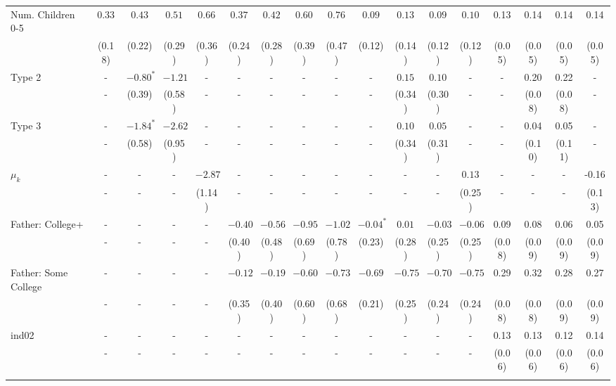 \begin{tabular}{lcccccccccccccccc}
Num. Children 0-5&$0.33$&$0.43$&$0.51$&$0.66$&$0.37$&$0.42$&$0.60$&$0.76$&$0.09$&$0.13$&$0.09$&$0.10$&0.13&0.14&0.14&0.14\\
&(0.18)&(0.22)&(0.29)&(0.36)&(0.24)&(0.28)&(0.39)&(0.47)&(0.12)&(0.14)&(0.12)&(0.12)&(0.05)&(0.05)&(0.05)&(0.05)\\
Type 2&-&$-0.80^{*}$&$-1.21$&-&-&-&-&-&-&$0.15$&$0.10$&-&-&0.20&0.22&-\\
&-&(0.39)&(0.58)&-&-&-&-&-&-&(0.34)&(0.30)&-&-&(0.08)&(0.08)&-\\
Type 3&-&$-1.84^{*}$&$-2.62$&-&-&-&-&-&-&$0.10$&$0.05$&-&-&0.04&0.05&-\\
&-&(0.58)&(0.95)&-&-&-&-&-&-&(0.34)&(0.31)&-&-&(0.10)&(0.11)&-\\
$\mu_{k}$&-&-&-&$-2.87$&-&-&-&-&-&-&-&$0.13$&-&-&-&-0.16\\
&-&-&-&(1.14)&-&-&-&-&-&-&-&(0.25)&-&-&-&(0.13)\\
Father: College+&-&-&-&-&$-0.40$&$-0.56$&$-0.95$&$-1.02$&$-0.04^{*}$&$0.01$&$-0.03$&$-0.06$&0.09&0.08&0.06&0.05\\
&-&-&-&-&(0.40)&(0.48)&(0.69)&(0.78)&(0.23)&(0.28)&(0.25)&(0.25)&(0.08)&(0.09)&(0.09)&(0.09)\\
Father: Some College&-&-&-&-&$-0.12$&$-0.19$&$-0.60$&$-0.73$&$-0.69$&$-0.75$&$-0.70$&$-0.75$&0.29&0.32&0.28&0.27\\
&-&-&-&-&(0.35)&(0.40)&(0.60)&(0.68)&(0.21)&(0.25)&(0.24)&(0.24)&(0.08)&(0.08)&(0.09)&(0.09)\\
ind02&-&-&-&-&-&-&-&-&-&-&-&-&0.13&0.13&0.12&0.14\\
&-&-&-&-&-&-&-&-&-&-&-&-&(0.06)&(0.06)&(0.06)&(0.06)\\
\\
\bottomrule\end{tabular}